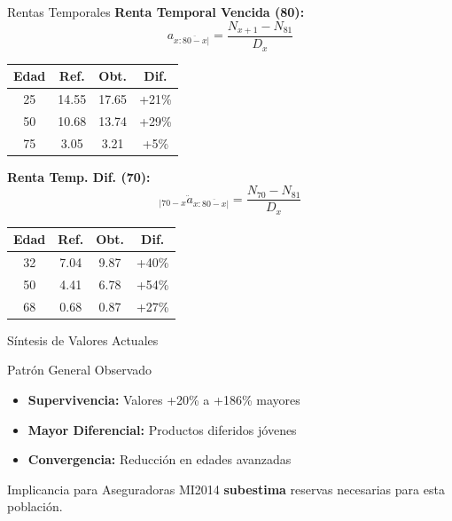 \begin{frame}{Rentas Temporales}
  \small
  \textbf{Renta Temporal Vencida (80):}
  \vspace{-0.15cm}
  \[ a_{x:\overline{80-x}|} = \frac{N_{x+1} - N_{81}}{D_x} \]
  \vspace{-0.3cm}
  
  \begin{table}
    \centering
    \footnotesize
    \begin{tabular}{cccc}
      \toprule
      \textbf{Edad} & \textbf{Ref.} & \textbf{Obt.} & \textbf{Dif.} \\
      \midrule
      25 & 14.55 & 17.65 & +21\% \\
      50 & 10.68 & 13.74 & +29\% \\
      75 & 3.05 & 3.21 & +5\% \\
      \bottomrule
    \end{tabular}
  \end{table}

  \vspace{-0.15cm}
  \textbf{Renta Temp. Dif. (70):}
  \vspace{-0.15cm}
  \[ {}_{|70-x}\ddot{a}_{x:\overline{80-x}|} = \frac{N_{70} - N_{81}}{D_x} \]
  \vspace{-0.3cm}
  
  \begin{table}
    \centering
    \footnotesize
    \begin{tabular}{cccc}
      \toprule
      \textbf{Edad} & \textbf{Ref.} & \textbf{Obt.} & \textbf{Dif.} \\
      \midrule
      32 & 7.04 & 9.87 & +40\% \\
      50 & 4.41 & 6.78 & +54\% \\
      68 & 0.68 & 0.87 & +27\% \\
      \bottomrule
    \end{tabular}
  \end{table}
\end{frame}

\begin{frame}{Síntesis de Valores Actuales}
  \begin{block}{Patrón General Observado}
    \small
    \begin{itemize}
      \item \textbf{Supervivencia:} Valores +20\% a +186\% mayores
      \item \textbf{Mayor Diferencial:} Productos diferidos jóvenes
      \item \textbf{Convergencia:} Reducción en edades avanzadas
    \end{itemize}
  \end{block}
  
  \vspace{0.2cm}
  
  \begin{alertblock}{Implicancia para Aseguradoras}
    \small
    MI2014 \textbf{subestima} reservas necesarias para esta población.
  \end{alertblock}
\end{frame}
